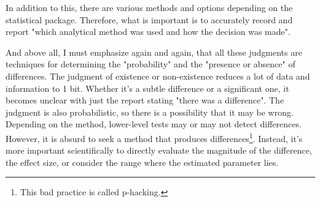 \documentclass{ltjbook}
\begin{document}
In addition to this, there are various methods and options depending on the statistical package. Therefore, what is important is to accurately record and report "which analytical method was used and how the decision was made".

And above all, I must emphasize again and again, that all these judgments are techniques for determining the "probability" and the "presence or absence" of differences. The judgment of existence or non-existence reduces a lot of data and information to 1 bit. Whether it's a subtle difference or a significant one, it becomes unclear with just the report stating "there was a difference". The judgment is also probabilistic, so there is a possibility that it may be wrong. Depending on the method, lower-level tests may or may not detect differences. However, it is absurd to seek a method that produces differences\footnote{This bad practice is called p-hacking.}. Instead, it's more important scientifically to directly evaluate the magnitude of the difference, the effect size, or consider the range where the estimated parameter lies.
\end{document}
